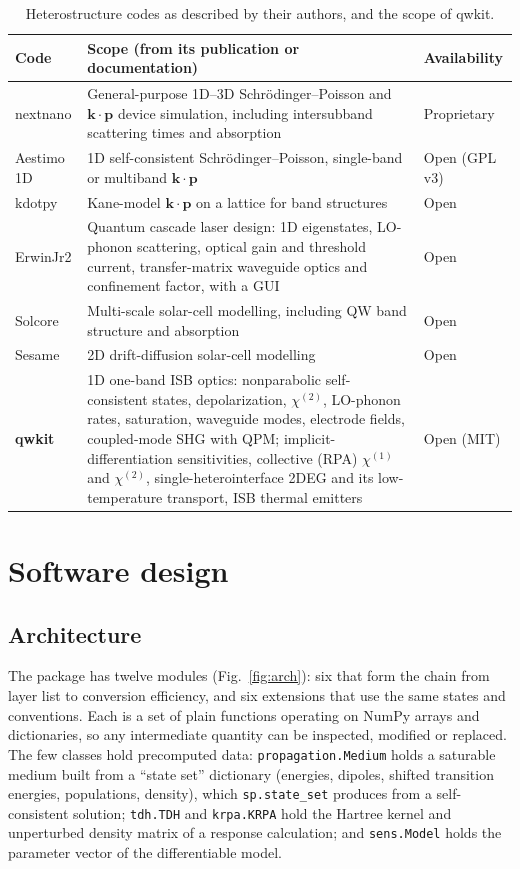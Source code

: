 \documentclass[11pt]{article}
\newcommand{\chitwo}{\chi^{(2)}}
\newcommand{\code}[1]{\texttt{#1}}
\begin{document}
\begin{table}[t]
\centering\small
\caption{Heterostructure codes as described by their authors, and the scope of qwkit.}\label{tab:field}
\begin{tabularx}{\textwidth}{@{}lXl@{}}
\toprule
Code & Scope (from its publication or documentation) & Availability \\ \midrule
nextnano \cite{Birner2007} & General-purpose 1D--3D Schr\"odinger--Poisson and $\mathbf{k}\cdot\mathbf{p}$ device simulation, including intersubband scattering times and absorption \cite{nextnanoBench} & Proprietary \\
Aestimo 1D \cite{Hebal2021} & 1D self-consistent Schr\"odinger--Poisson, single-band or multiband $\mathbf{k}\cdot\mathbf{p}$ & Open (GPL v3) \\
kdotpy \cite{Beugeling2025} & Kane-model $\mathbf{k}\cdot\mathbf{p}$ on a lattice for band structures & Open \\
ErwinJr2 \cite{ErwinJr2} & Quantum cascade laser design: 1D eigenstates, LO-phonon scattering, optical gain and threshold current, transfer-matrix waveguide optics and confinement factor, with a GUI & Open \\
Solcore \cite{AlonsoAlvarez2018} & Multi-scale solar-cell modelling, including QW band structure and absorption & Open \\
Sesame \cite{Gaury2019} & 2D drift-diffusion solar-cell modelling & Open \\
\textbf{qwkit} & 1D one-band ISB optics: nonparabolic self-consistent states, depolarization, $\chitwo$, LO-phonon rates, saturation, waveguide modes, electrode fields, coupled-mode SHG with QPM; implicit-differentiation sensitivities, collective (RPA) $\chi^{(1)}$ and $\chitwo$, single-heterointerface 2DEG and its low-temperature transport, ISB thermal emitters & Open (MIT) \\ \bottomrule
\end{tabularx}
\end{table}

\section{Software design}
\subsection{Architecture}
The package has twelve modules (Fig.~\ref{fig:arch}): six that form the chain from layer list to conversion efficiency, and six extensions that use the same states and conventions. Each is a set of plain functions operating on NumPy arrays and dictionaries, so any intermediate quantity can be inspected, modified or replaced. The few classes hold precomputed data: \code{propagation.Medium} holds a saturable medium built from a ``state set'' dictionary (energies, dipoles, shifted transition energies, populations, density), which \code{sp.state\_set} produces from a self-consistent solution; \code{tdh.TDH} and \code{krpa.KRPA} hold the Hartree kernel and unperturbed density matrix of a response calculation; and \code{sens.Model} holds the parameter vector of the differentiable model.
\end{document}
